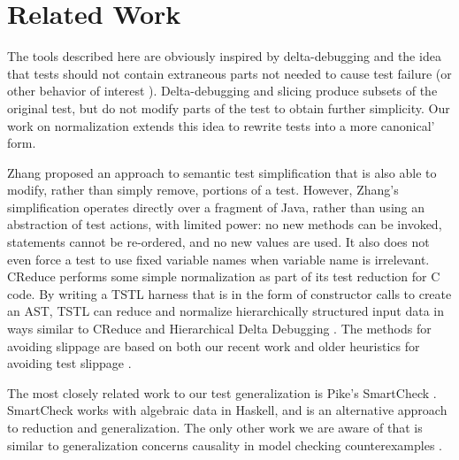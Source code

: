 \section{Related Work}

The tools described here are obviously inspired by  delta-debugging
\cite{DD} and the idea that tests should not contain extraneous parts not needed to
cause test failure (or other behavior of interest \cite{icst2014,stvrcausereduce}).  Delta-debugging and slicing
\cite{TCminim} produce subsets of the
original test, but do not modify parts of the test to obtain further
simplicity.  Our work on normalization \cite{OneTest} extends this
idea to rewrite tests into a more canonical' form.  

Zhang \cite{SaiSimple} proposed an approach to semantic
test simplification that is also able to modify, rather
than simply remove, portions of a test.  However, Zhang's simplification
operates directly over a fragment of Java, rather than
using an abstraction of test actions, with limited power: no new methods can be
invoked, statements cannot be re-ordered, and no new values are used.
It also does not even force a test to use
fixed variable names when variable name is irrelevant.  CReduce
\cite{CReduce} performs some simple normalization as part of its
test reduction for C code.  By writing a TSTL harness that is in the form of
constructor calls to create an AST, TSTL can reduce and normalize hierarchically
structured input data in ways similar to CReduce and Hierarchical
Delta Debugging \cite{HDD}.  The methods for avoiding slippage are
based on both our recent work \cite{slippage} and older heuristics for
avoiding test slippage \cite{ICSEDiff}.

The most closely related work to our test generalization \cite{OneTest} is Pike's
SmartCheck \cite{SmartCheck}.  SmartCheck works with algebraic data in
Haskell, and is an alternative approach to reduction
and generalization.  The only other work we are aware of that is
similar to generalization concerns causality in
model checking counterexamples \cite{FreeWill,MakeMost,SPIN03}.